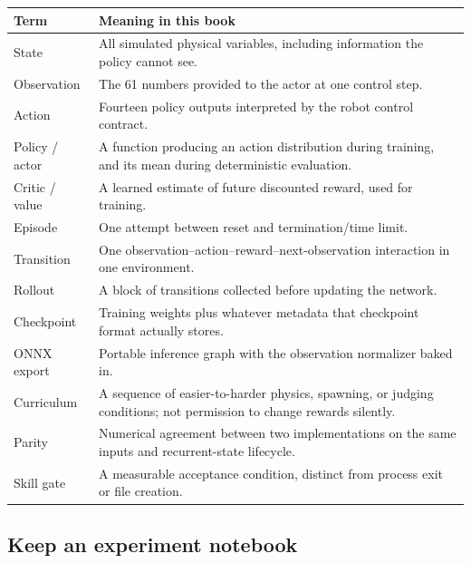 \documentclass[
  american,
  11pt,
  letterpaper,
]{article}
\newcounter{none} %
\begin{document}
{\def\LTcaptype{none} %
\begin{longtable}[]{@{}
  >{\raggedright\arraybackslash}p{}
  >{\raggedright\arraybackslash}p{}@{}}
\toprule\noalign{}
\begin{minipage}[b]{\linewidth}\raggedright
Term
\end{minipage} & \begin{minipage}[b]{\linewidth}\raggedright
Meaning in this book
\end{minipage} \\
\midrule\noalign{}
\endhead
\bottomrule\noalign{}
\endlastfoot
State & All simulated physical variables, including information the
policy cannot see. \\
Observation & The 61 numbers provided to the actor at one control
step. \\
Action & Fourteen policy outputs interpreted by the robot control
contract. \\
Policy / actor & A function producing an action distribution during
training, and its mean during deterministic evaluation. \\
Critic / value & A learned estimate of future discounted reward, used
for training. \\
Episode & One attempt between reset and termination/time limit. \\
Transition & One observation--action--reward--next-observation
interaction in one environment. \\
Rollout & A block of transitions collected before updating the
network. \\
Checkpoint & Training weights plus whatever metadata that checkpoint
format actually stores. \\
ONNX export & Portable inference graph with the observation normalizer
baked in. \\
Curriculum & A sequence of easier-to-harder physics, spawning, or
judging conditions; not permission to change rewards silently. \\
Parity & Numerical agreement between two implementations on the same
inputs and recurrent-state lifecycle. \\
Skill gate & A measurable acceptance condition, distinct from process
exit or file creation. \\
\end{longtable}
}

\subsection{Keep an experiment
notebook}\label{keep-an-experiment-notebook}
\end{document}

